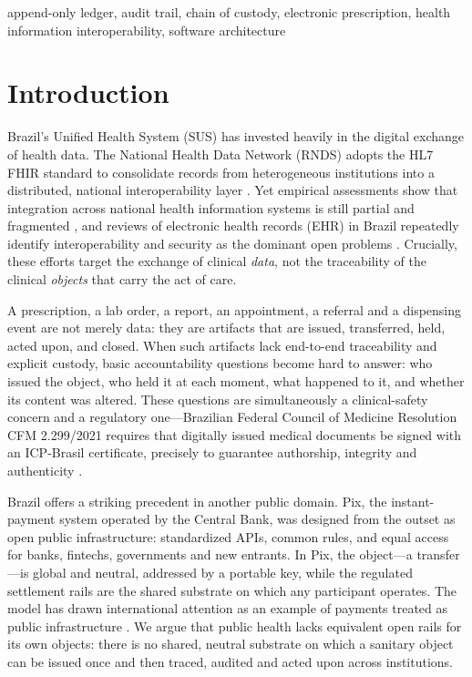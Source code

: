 \documentclass[conference]{IEEEtran}
\begin{document}
\begin{IEEEkeywords}
append-only ledger, audit trail, chain of custody, electronic prescription, health information interoperability, software architecture
\end{IEEEkeywords}

\section{Introduction}
Brazil's Unified Health System (SUS) has invested heavily in the digital exchange of health data. The National Health Data Network (RNDS) adopts the HL7 FHIR standard to consolidate records from heterogeneous institutions into a distributed, national interoperability layer \cite{rnds,rndsfhir}. Yet empirical assessments show that integration across national health information systems is still partial and fragmented \cite{esus}, and reviews of electronic health records (EHR) in Brazil repeatedly identify interoperability and security as the dominant open problems \cite{barbalho,conrado}. Crucially, these efforts target the exchange of clinical \emph{data}, not the traceability of the clinical \emph{objects} that carry the act of care.

A prescription, a lab order, a report, an appointment, a referral and a dispensing event are not merely data: they are artifacts that are issued, transferred, held, acted upon, and closed. When such artifacts lack end-to-end traceability and explicit custody, basic accountability questions become hard to answer: who issued the object, who held it at each moment, what happened to it, and whether its content was altered. These questions are simultaneously a clinical-safety concern and a regulatory one---Brazilian Federal Council of Medicine Resolution CFM 2.299/2021 requires that digitally issued medical documents be signed with an ICP-Brasil certificate, precisely to guarantee authorship, integrity and authenticity \cite{cfm}.

Brazil offers a striking precedent in another public domain. Pix, the instant-payment system operated by the Central Bank, was designed from the outset as open public infrastructure: standardized APIs, common rules, and equal access for banks, fintechs, governments and new entrants. In Pix, the object---a transfer---is global and neutral, addressed by a portable key, while the regulated settlement rails are the shared substrate on which any participant operates. The model has drawn international attention as an example of payments treated as public infrastructure \cite{pix}. We argue that public health lacks equivalent open rails for its own objects: there is no shared, neutral substrate on which a sanitary object can be issued once and then traced, audited and acted upon across institutions.
\end{document}
